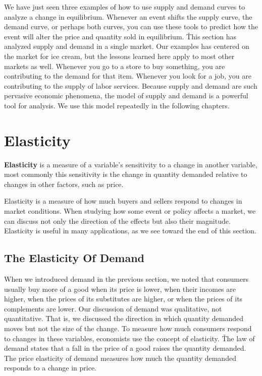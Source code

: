 We have just seen three examples of how to use supply and demand curves to analyze a change in equilibrium. Whenever
an event shifts the supply curve, the demand curve, or perhaps both curves, you can use these tools to predict how
the event will alter the price and quantity sold in equilibrium. \v

This section has analyzed supply and demand in a single market. Our examples has centered on the market for ice
cream, but the lessons learned here apply to most other markets as well. Whenever you go to a store to buy something,
you are contributing to the demand for that item. Whenever you look for a job, you are contributing to the supply of
labor services. Because supply and demand are such pervasive economic phenomena, the model of supply and demand is a
powerful tool for analysis. We use this model repeatedly in the following chapters.

\section{Elasticity}

\bd[Elasticity]
\textbf{Elasticity} is a measure of a variable's sensitivity to a change in another variable, most commonly this
sensitivity is the change in quantity demanded relative to changes in other factors, such as price.
\ed

Elasticity is a measure of how much buyers and sellers respond to changes in market conditions. When studying how
some event or policy affects a market, we can discuss not only the direction of the effects but also their magnitude.
Elasticity is useful in many applications, as we see toward the end of this section.

\subsection{The Elasticity Of Demand}

When we introduced demand in the previous section, we noted that consumers usually buy more of a good when its price
is lower, when their incomes are higher, when the prices of its substitutes are higher, or when the prices of its
complements are lower. Our discussion of demand was qualitative, not quantitative. That is, we discussed the
direction in which quantity demanded moves but not the size of the change. To measure how much consumers respond to
changes in these variables, economists use the concept of elasticity. \v

The law of demand states that a fall in the price of a good raises the quantity demanded. The price elasticity of
demand measures how much the quantity demanded responds to a change in price.


